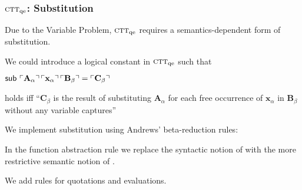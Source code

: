 \documentclass[t,12pt,numbers,fleqn]{beamer}
\newcommand{\churchqe}{$\mbox{\sc ctt}_{\rm qe}$}
\begin{document}
\begin{frame}
\frametitle{{\churchqe}: Substitution}
\bi

  \item Due to the Variable Problem, {\churchqe} requires a
    semantics-dependent form of substitution.

\pause

  \item We could introduce a logical constant  in {\churchqe}
    such that

  \bi

    \item[] $\mbox{\sf sub}\,\, \ulcorner\textbf{A}_\alpha\urcorner \,
      \ulcorner\textbf{x}_\alpha\urcorner \, \ulcorner\textbf{B}_\beta\urcorner =
     \ulcorner\textbf{C}_\beta\urcorner$

  \ei

  holds iff ``$\textbf{C}_\beta$ is the result of substituting
      $\textbf{A}_\alpha$ for each free occurrence of
      $\textbf{x}_\alpha$ in $\textbf{B}_\beta$ without any variable
      captures''\\ 

\pause

  \item We implement substitution using Andrews' beta-reduction rules:

  \bi

    \item In the function abstraction rule we replace the
      syntactic notion of  with the more restrictive semantic notion of
      .

    \item We add rules for quotations and evaluations.

  \ei

\pause

  \item {}

\ei
\end{frame}

\end{document}
